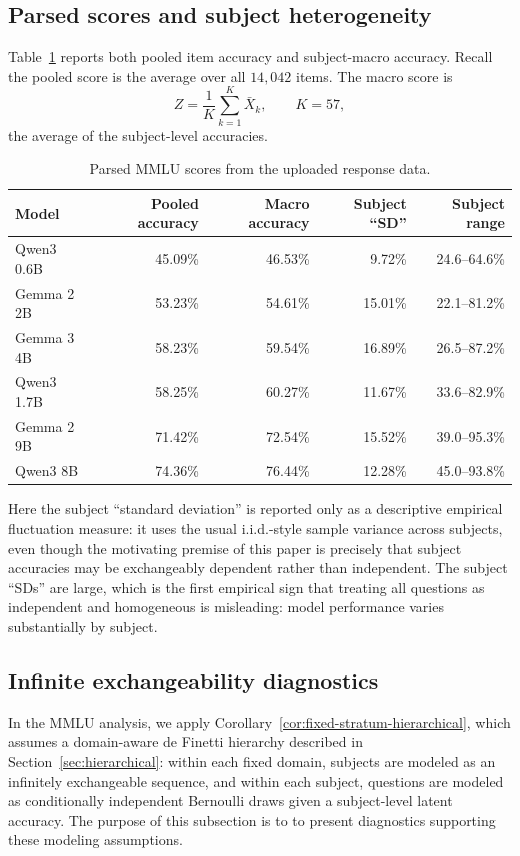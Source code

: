 \documentclass[11pt]{article}
\theoremstyle{definition}
\theoremstyle{remark}
\begin{document}
\subsection{Parsed scores and subject heterogeneity}

Table~\ref{tab:mmlu-scores} reports both pooled item accuracy and subject-macro accuracy. Recall the pooled score is the average over all $14{,}042$ items.  The macro score is
\[
    Z=\frac1K\sum_{k=1}^K \bar X_k,
    \qquad K=57,
\]
the average of the subject-level accuracies. 

\begin{table}[h!]
\centering
\caption{Parsed MMLU scores from the uploaded response data. }
\label{tab:mmlu-scores}
\begin{tabular}{lrrrr}
\toprule
Model & Pooled accuracy & Macro accuracy & Subject ``SD'' & Subject range \\
\midrule
Qwen3 0.6B & 45.09\% & 46.53\% & 9.72\% & 24.6--64.6\% \\
Gemma 2 2B & 53.23\% & 54.61\% & 15.01\% & 22.1--81.2\% \\
Gemma 3 4B & 58.23\% & 59.54\% & 16.89\% & 26.5--87.2\% \\
Qwen3 1.7B & 58.25\% & 60.27\% & 11.67\% & 33.6--82.9\% \\
Gemma 2 9B & 71.42\% & 72.54\% & 15.52\% & 39.0--95.3\% \\
Qwen3 8B & 74.36\% & 76.44\% & 12.28\% & 45.0--93.8\% \\
\bottomrule
\end{tabular}
\end{table}
Here the subject ``standard deviation'' is reported only as a descriptive empirical fluctuation measure: it uses the usual i.i.d.-style sample variance across subjects, even though the motivating premise of this paper is precisely that subject accuracies may be exchangeably dependent rather than independent. The subject ``SDs'' are large, which is the first empirical sign that treating all questions as independent and homogeneous is misleading: model performance varies substantially by subject.


\subsection{Infinite exchangeability diagnostics}
\label{sec:mmlu-exchangeability-diagnostics}

In the MMLU analysis, we apply Corollary~\ref{cor:fixed-stratum-hierarchical}, which assumes a domain-aware de Finetti hierarchy described in Section~\ref{sec:hierarchical}: within each fixed domain, subjects are modeled as an infinitely exchangeable sequence, and within each subject, questions are modeled as conditionally independent Bernoulli draws given a subject-level latent accuracy.  The purpose of this subsection is to to present diagnostics supporting these modeling assumptions.
\end{document}
